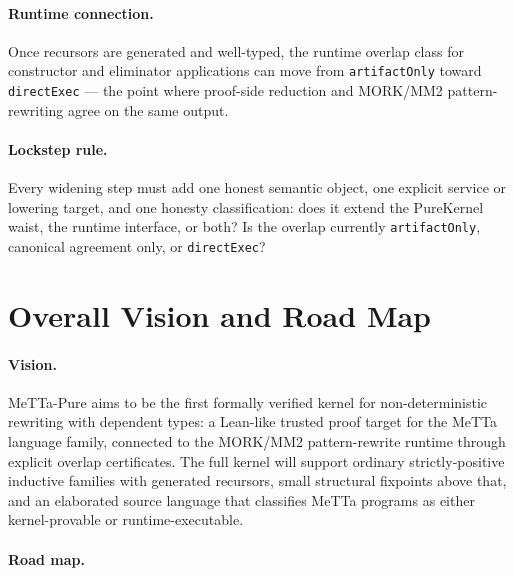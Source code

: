 \documentclass[11pt]{article}
\theoremstyle{remark}
\newcommand{\MeTTa}{\textup{MeTTa}}
\newcommand{\MORK}{\textup{MORK}}
\newcommand{\code}[1]{\texttt{#1}}
\begin{document}
\paragraph{Runtime connection.}
Once recursors are generated and well-typed, the runtime overlap class for
constructor and eliminator applications can move from
\code{artifactOnly} toward \code{directExec} --- the point where proof-side
reduction and MORK/MM2 pattern-rewriting agree on the same output.

\paragraph{Lockstep rule.}
Every widening step must add one honest semantic object, one explicit service
or lowering target, and one honesty classification: does it extend the
PureKernel waist, the runtime interface, or both? Is the overlap currently
\code{artifactOnly}, canonical agreement only, or \code{directExec}?

\section{Overall Vision and Road Map}
\label{sec:vision}

\paragraph{Vision.}
\MeTTa-Pure aims to be the first formally verified kernel for
non-deterministic rewriting with dependent types: a Lean-like trusted proof
target for the MeTTa language family, connected to the \MORK{}/MM2 pattern-rewrite
runtime through explicit overlap certificates.
The full kernel will support ordinary strictly-positive inductive families
with generated recursors, small structural fixpoints above that, and an
elaborated source language that classifies \MeTTa{} programs as either
kernel-provable or runtime-executable.

\paragraph{Road map.}
\end{document}
